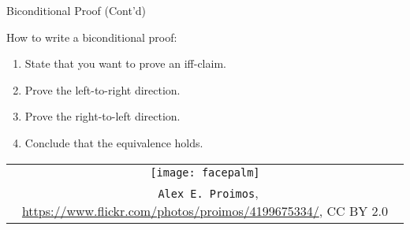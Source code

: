 \begin{frame}{Biconditional Proof (Cont'd)}

How to write a biconditional proof:
			
				\begin{enumerate}[1.]
				
					\item State that you want to prove an iff-claim.
					
					\item Prove the left-to-right direction.
					
					\item Prove the right-to-left direction.
					
					\item Conclude that the equivalence holds.
									
				\end{enumerate}
				
								\begin{center}

\begin{tabular}{c}
		\texttt{[image: facepalm]}\\[-1ex]
		{\tiny \textcopyright~\texttt{Alex E. Proimos}, \url{https://www.flickr.com/photos/proimos/4199675334/}, CC BY 2.0}
		\end{tabular}
		\end{center}

\end{frame}


